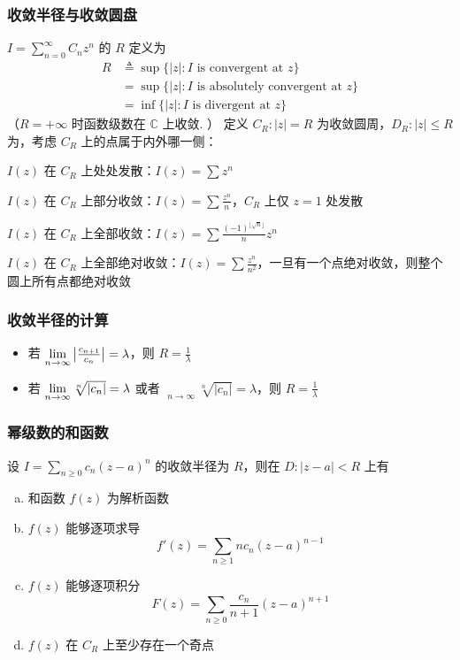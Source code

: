 \documentclass[./main.tex]{subfiles}
\begin{document}
\subsubsection{收敛半径与收敛圆盘}
$I=\sum_{n=0}^{\infty}C_nz^n$ 的 $R$ 定义为
\begin{align*}
R&\triangleq\sup\{|z|:I\text{ is convergent at }z\}\\
&=\sup\{|z|:I\text{ is absolutely convergent at }z\}\\
&=\inf\{|z|:I\text{ is divergent at } z\}
\end{align*}
（$R=+\infty$ 时函数级数在 $\mathbb{C}$ 上收敛. ）
定义 $C_R:|z|=R$ 为收敛圆周，$D_R:|z|\le R$ 为，考虑 $C_R$ 上的点属于内外哪一侧：
\begin{itemize*}
\item $I(z)$ 在 $C_R$ 上处处发散：$I(z)=\sum z^n$
\item $I(z)$ 在 $C_R$ 上部分收敛：$I(z)=\sum\frac{z^n}{n}$，$C_R$ 上仅 $z=1$ 处发散
\item $I(z)$ 在 $C_R$ 上全部收敛：$I(z)=\sum\frac{(-1)^{\lfloor\sqrt{n}\rfloor}}{n}z^n$
\item $I(z)$ 在 $C_R$ 上全部绝对收敛：$I(z)=\sum \frac{z^n}{n^2}$，一旦有一个点绝对收敛，则整个圆上所有点都绝对收敛
\end{itemize*}
\subsubsection{收敛半径的计算}
\begin{itemize}
\item 若 $\lim\limits_{n\rightarrow\infty}\big|\frac{c_{n+1}}{c_n}\big|=\lambda$，则 $R=\frac{1}{\lambda}$
\item 若 $\lim\limits_{n\rightarrow\infty}\sqrt[n]{|c_n|}=\lambda$ 或者 $\mathop{\overline{\lim}}\limits_{n\rightarrow\infty}\sqrt[n]{|c_n|}=\lambda$，则 $R=\frac{1}{\lambda}$
\end{itemize}
\subsubsection{幂级数的和函数}
设 $I=\sum_{n\ge 0}c_n(z-a)^n$ 的收敛半径为 $R$，则在 $D:|z-a|<R$ 上有
\begin{enumerate}[(a)]
    \item 和函数 $f(z)$ 为解析函数
    \item $f(z)$ 能够逐项求导
    $$f'(z)=\sum_{n\ge 1}nc_n(z-a)^{n-1}$$
    \item $f(z)$ 能够逐项积分
    $$F(z)=\sum_{n\ge 0}\frac{c_n}{n+1}(z-a)^{n+1}$$
    \item $f(z)$ 在 $C_R$ 上至少存在一个奇点
\end{enumerate}
\end{document}
